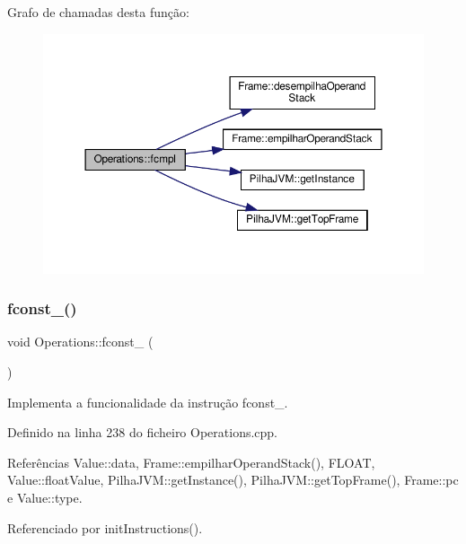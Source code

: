 Grafo de chamadas desta função\+:
\nopagebreak
\begin{figure}[H]
\begin{center}
\leavevmode
\includegraphics[width=350pt]{classOperations_aa4a8e2be93a5cc69e40f483958014e39_cgraph}
\end{center}
\end{figure}
\mbox{\label{classOperations_ad3d2d82d63e7a96e144cdf014d6fb1d9}} 
\subsubsection{\texorpdfstring{fconst\+\_()}{fconst\_0()}}
{\footnotesize\ttfamily void Operations\+::fconst\+\_ (\begin{DoxyParamCaption}{ }\end{DoxyParamCaption})\hspace{0.3cm}{\ttfamily [private]}}



Implementa a funcionalidade da instrução fconst\+\_. 



Definido na linha 238 do ficheiro Operations.\+cpp.



Referências Value\+::data, Frame\+::empilhar\+Operand\+Stack(), F\+L\+O\+AT, Value\+::float\+Value, Pilha\+J\+V\+M\+::get\+Instance(), Pilha\+J\+V\+M\+::get\+Top\+Frame(), Frame\+::pc e Value\+::type.



Referenciado por init\+Instructions().

